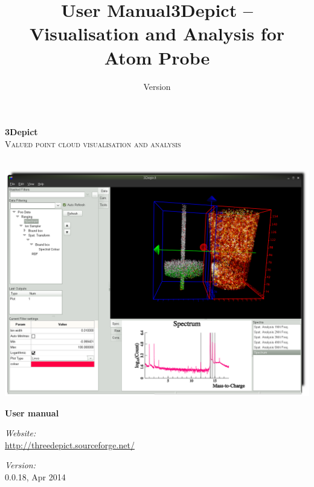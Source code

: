 \documentclass[10pt]{article}
\title{User Manual}
\date{Version}
\author{}
\begin{document}
\begin{titlepage}

\begin{center}
\vspace{3 cm}
\Huge \textbf{3Depict}\\[1.0cm]

\textsc{\Large Valued point cloud visualisation and analysis}\\
\hrulefill \\[1.0cm]

\begin{center}
 \includegraphics[width=\textwidth,keepaspectratio=true]{./figures/CoverImage.png}
\end{center}
\vspace{1.0 cm}


{ \Huge \bfseries User manual}\\[0.4cm]
\vspace{1.0 cm}


\begin{minipage}{0.5\textwidth}
\begin{flushleft} \large
\emph{Website:}\\
\url{http://threedepict.sourceforge.net/}\end{flushleft}
\end{minipage}
\begin{minipage}{0.3\textwidth}
\begin{flushright} \large
\emph{Version:} \\
 0.0.18, Apr 2014\end{flushright}
\end{minipage}

\vfill

\end{center}

\end{titlepage}
\clearpage
{}
\tableofcontents
\clearpage
{}
\title{3Depict -- Visualisation and Analysis for Atom Probe}
\end{document}
